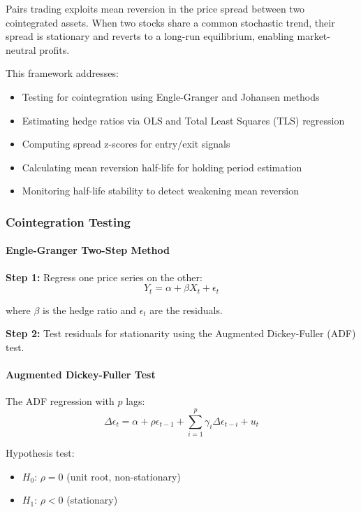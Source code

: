 Pairs trading exploits mean reversion in the price spread between two cointegrated assets. When two stocks share a common stochastic trend, their spread is stationary and reverts to a long-run equilibrium, enabling market-neutral profits.

This framework addresses:
\begin{itemize}
  \item Testing for cointegration using Engle-Granger and Johansen methods
  \item Estimating hedge ratios via OLS and Total Least Squares (TLS) regression
  \item Computing spread z-scores for entry/exit signals
  \item Calculating mean reversion half-life for holding period estimation
  \item Monitoring half-life stability to detect weakening mean reversion
\end{itemize}

\subsubsection{Cointegration Testing}

\paragraph{Engle-Granger Two-Step Method}

\textbf{Step 1:} Regress one price series on the other:
\[
Y_t = \alpha + \beta X_t + \epsilon_t
\]

where $\beta$ is the hedge ratio and $\epsilon_t$ are the residuals.

\textbf{Step 2:} Test residuals for stationarity using the Augmented Dickey-Fuller (ADF) test.

\paragraph{Augmented Dickey-Fuller Test}

The ADF regression with $p$ lags:
\[
\Delta \epsilon_t = \alpha + \rho \epsilon_{t-1} + \sum_{i=1}^{p} \gamma_i \Delta \epsilon_{t-i} + u_t
\]

Hypothesis test:
\begin{itemize}
  \item $H_0$: $\rho = 0$ (unit root, non-stationary)
  \item $H_1$: $\rho < 0$ (stationary)
\end{itemize}

